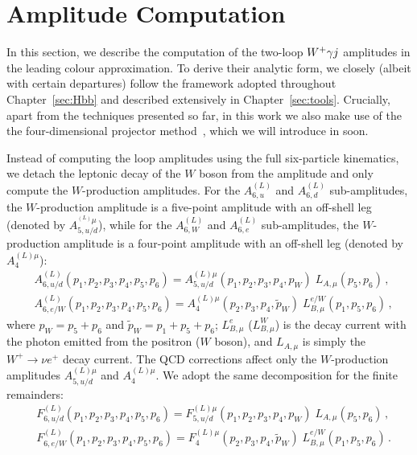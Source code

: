 \documentclass[main.tex]{subfiles}
\begin{document}
\section{Amplitude Computation}
\label{wyjsec:reduction}
In this section, we describe the computation of the two-loop $W^+\gamma j$ amplitudes in the leading colour approximation.
To derive their analytic form, we closely (albeit with certain departures) follow the framework adopted throughout Chapter~\ref{sec:Hbb} and described extensively in Chapter~\ref{sec:tools}. Crucially, apart from the techniques presented so far, in this work we also make use of the the four-dimensional projector method~\cite{Peraro:2019cjj,Peraro:2020sfm}, which we will introduce in soon.

Instead of computing the loop amplitudes using the full six-particle kinematics, 
we detach the leptonic decay of the $W$ boson from the amplitude and only compute the $W$-production amplitudes.
For the $A^{(L)}_{6,u}$ and $A^{(L)}_{6,d}$ sub-amplitudes, the $W$-production amplitude is a five-point amplitude with an off-shell leg (denoted by  $A_{5,u/d}^{^{(L)}\mu}$),
while for the $A^{(L)}_{6,W}$ and $A^{(L)}_{6,e}$ sub-amplitudes, the $W$-production amplitude is a four-point amplitude with an off-shell leg (denoted by $A_{4}^{{(L)}\mu}$):
\begin{align}
& A^{(L)}_{6,u/d}(p_1,p_2,p_3,p_4,p_5,p_6) = A_{5,u/d}^{(L)\mu}(p_1,p_2,p_3,p_4,p_W) \; L_{A,\mu}(p_5,p_6) \,, \label{Wyjeq:decayA}\\
& A^{(L)}_{6,e/W}(p_1,p_2,p_3,p_4,p_5,p_6) = A_{4}^{(L)\mu}(p_2,p_3,p_4,\tilde{p}_W) \; L^{e/W}_{B,\mu}(p_1,p_5,p_6) \,, \label{Wyjeq:decayB}
\end{align}
where $p_W = p_5 + p_6$ and  $\tilde{p}_W = p_1 + p_5 + p_6$;
$L^{e}_{B,\mu}$ ($L^{W}_{B,\mu}$) is the decay current with the photon emitted from the positron ($W$ boson), and $L_{A,\mu}$ is simply the $W^+ \to \nu e^+$ decay current.
The QCD corrections affect only the $W$-production amplitudes $A_{5,u/d}^{(L)\mu}$ and $A_{4}^{(L)\mu}$. We adopt the same decomposition for the finite remainders:
\begin{align}
& F^{(L)}_{6,u/d}(p_1,p_2,p_3,p_4,p_5,p_6) = F_{5,u/d}^{(L)\mu}(p_1,p_2,p_3,p_4,p_W) \; L_{A,\mu}(p_5,p_6) \,, \label{Wyjeq:decayAF}\\
& F^{(L)}_{6,e/W}(p_1,p_2,p_3,p_4,p_5,p_6) = F_{4}^{(L)\mu}(p_2,p_3,p_4,\tilde{p}_W) \; L^{e/W}_{B,\mu}(p_1,p_5,p_6) \,. \label{Wyjeq:decayBF}
\end{align}
\end{document}

